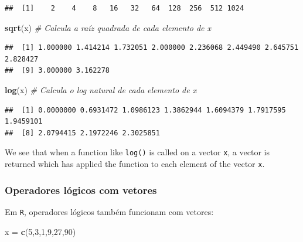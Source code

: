 \documentclass[
]{book}
\newenvironment{Shaded}{\begin{snugshade}}{\end{snugshade}}
\newcommand{\CommentTok}[1]{\textcolor[rgb]{0.56,0.35,0.01}{\textit{#1}}}
\newcommand{\DecValTok}[1]{\textcolor[rgb]{0.00,0.00,0.81}{#1}}
\newcommand{\KeywordTok}[1]{\textcolor[rgb]{0.13,0.29,0.53}{\textbf{#1}}}
\newcommand{\NormalTok}[1]{#1}
\newcommand{\StringTok}[1]{\textcolor[rgb]{0.31,0.60,0.02}{#1}}
\theoremstyle{definition}
\theoremstyle{definition}
\theoremstyle{definition}
\theoremstyle{remark}
\begin{document}
\begin{verbatim}
##  [1]    2    4    8   16   32   64  128  256  512 1024
\end{verbatim}

\begin{Shaded}
\begin{Highlighting}[]
\KeywordTok{sqrt}\NormalTok{(x)   }\CommentTok{# Calcula a raíz quadrada de cada elemento de x}
\end{Highlighting}
\end{Shaded}

\begin{verbatim}
##  [1] 1.000000 1.414214 1.732051 2.000000 2.236068 2.449490 2.645751 2.828427
##  [9] 3.000000 3.162278
\end{verbatim}

\begin{Shaded}
\begin{Highlighting}[]
\KeywordTok{log}\NormalTok{(x)    }\CommentTok{# Calcula o log natural de cada elemento de x}
\end{Highlighting}
\end{Shaded}

\begin{verbatim}
##  [1] 0.0000000 0.6931472 1.0986123 1.3862944 1.6094379 1.7917595 1.9459101
##  [8] 2.0794415 2.1972246 2.3025851
\end{verbatim}

We see that when a function like \texttt{log()} is called on a vector \texttt{x}, a vector is returned which has applied the function to each element of the vector \texttt{x}.

\hypertarget{operadores-luxf3gicos-com-vetores}{%
\subsubsection{Operadores lógicos com vetores}\label{operadores-luxf3gicos-com-vetores}}

Em \texttt{R}, operadores lógicos também funcionam com vetores:

\begin{Shaded}
\begin{Highlighting}[]
\NormalTok{x =}\StringTok{ }\KeywordTok{c}\NormalTok{(}\DecValTok{5}\NormalTok{,}\DecValTok{3}\NormalTok{,}\DecValTok{1}\NormalTok{,}\DecValTok{9}\NormalTok{,}\DecValTok{27}\NormalTok{,}\DecValTok{90}\NormalTok{)}
\end{Highlighting}
\end{Shaded}
\end{document}
